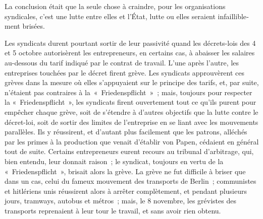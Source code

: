 \documentclass[french,twoside]{book} %
\begin{document}
La conclusion était que la seule chose à craindre, pour les organisations syndicales, c'est une lutte entre elles et l'État, lutte ou elles seraient infaillible­ment brisées.\par
Les syndicats durent pourtant sortir de leur passivité quand les décrets-lois des 4 et 5 octobre autorisèrent les entrepreneurs, en certains cas, à abaisser les salaires au-dessous du tarif indiqué par le contrat de travail. L'une après l'autre, les entreprises touchées par le décret firent grève. Les syndicats approu­vèrent ces grèves dans la mesure où elles s'appuyaient sur le principe des tarifs, et, par suite, n'étaient pas contraires à la « Friedenspflicht » ; mais, toujours pour respecter la « Friedenspflicht », les syndicats firent ouvertement tout ce qu'ils purent pour empêcher chaque grève, soit de s'étendre à d'autres objectifs que la lutte contre le décret-loi, soit de sortir des limites de l'entre­prise en se liant avec les mouvements parallèles. Ils y réussirent, et d'autant plus facilement que les patrons, alléchés par les primes à la production que venait d'établir von Papen, cédaient en général tout de suite. Certains entrepre­neurs eurent recours au tribunal d'arbitrage, qui, bien entendu, leur donnait raison ; le syndicat, toujours en vertu de la « Friedenspflicht », brisait alors la grève. La grève ne fut difficile à briser que dans un cas, celui du fameux mouvement des transports de Berlin ; communistes et hitlériens unis réussirent alors à arrêter complètement, et pendant plusieurs jours, tramways, autobus et métros ; mais, le 8 novembre, les grévistes des transports reprenaient à leur tour le travail, et sans avoir rien obtenu.\par
\end{document}
